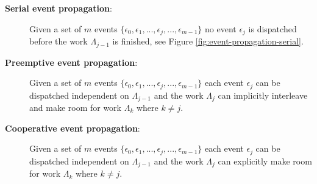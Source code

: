 \begin{description}

    \item[\textbf{Serial event propagation}:] Given a set of $m$ events $\{
            \epsilon_0, \epsilon_1, ..., \epsilon_j, ..., \epsilon_{m-1} \}$ no
        event $\epsilon_j$ is dispatched before the work $\Lambda_{j-1}$ is
        finished, see Figure \ref{fig:event-propagation-serial}.

    \item[\textbf{Preemptive event propagation}:] Given a set of $m$ events $\{
            \epsilon_0, \epsilon_1, ..., \epsilon_j, ..., \epsilon_{m-1} \}$
        each event $\epsilon_j$ can be dispatched independent on
        $\Lambda_{j-1}$ and the work $\Lambda_j$ can implicitly interleave and
        make room for work $\Lambda_k$ where $k \ne j$.

    \item[\textbf{Cooperative event propagation}:] Given a set of $m$ events
        $\{ \epsilon_0, \epsilon_1, ..., \epsilon_j, ..., \epsilon_{m-1} \}$
        each event $\epsilon_j$ can be dispatched independent on
        $\Lambda_{j-1}$ and the work $\Lambda_j$ can explicitly make room for
        work $\Lambda_k$ where $k \ne j$.

\end{description}


